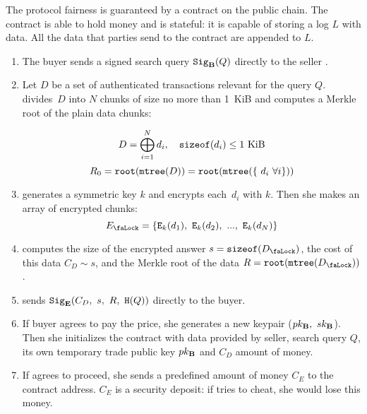 The protocol fairness is guaranteed by a contract on the public chain. The contract is able to hold money and is stateful: it is capable of storing a log $L$ with data. All the data that parties send to the contract are appended to $L$.
\begin{enumerate}
\item The buyer  sends a signed search query $\mathtt{Sig}_{\mathbf{B}}(Q)$ directly to the seller .
\item Let $D$ be a set of authenticated transactions relevant for the query $Q$.  divides~$D$ into $N$ chunks of size no more than 1~KiB and computes a Merkle root of the plain data chunks:

\begin{equation}
D = \bigoplus_{i=1}^N d_i, \quad \mathtt{sizeof}(d_i) \leq 1~\mathrm{KiB}
\end{equation}
\begin{equation}
R_0 = \mathtt{root}(\mathtt{mtree}(D)) = \mathtt{root}(\mathtt{mtree}(\{\ d_i\ \forall i\}))
\end{equation}

\item {} generates a symmetric key $k$ and encrypts each~$d_i$ with $k$. Then she makes an array of encrypted chunks:
\begin{equation}
\Lock{E} = \{ \Encrypt_\Key{k}(d_1),\ \Encrypt_\Key{k}(d_2),\ ...,\ \Encrypt_\Key{k}(d_N) \}
\end{equation}

\item {} computes the size of the encrypted answer $s = \SizeOf(\Lock{D})$, the cost of this data $C_D \sim s$, and the Merkle root of the data $R = \Root(\MerkleTree(\Lock{D}))$.

\item {} sends $\Sign_\Party{E}(C_D,\ s,\ R,\ \Hash(Q))$ directly to the buyer.

\item If buyer agrees to pay the price, she generates a new keypair ($pk_{\mathbf{B}},\ sk_{\mathbf{B}}$). Then she initializes the contract with data provided by seller, search query $Q$, its own temporary trade public key $pk_{\mathbf{B}}$ and $C_D$ amount of money.

\item \label{step:seller-deposits-money} If  agrees to proceed, she sends a predefined amount of money $C_E$ to the contract address. $C_E$ is a security deposit: if  tries to cheat, she would lose this money.


\end{enumerate}
